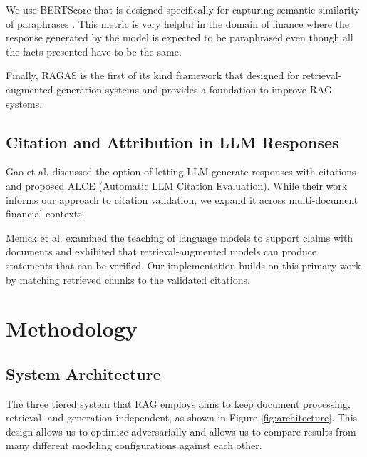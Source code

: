 \documentclass[runningheads]{llncs}
\begin{document}
We use BERTScore that is designed specifically for capturing semantic similarity of paraphrases \cite{zhang2019bertscore}. This metric is very helpful in the domain of finance where the response generated by the model is expected to be paraphrased even though all the facts presented have to be the same.

Finally, RAGAS \cite{es2023ragas} is the first of its kind framework that designed for retrieval-augmented generation systems and provides a foundation to improve RAG systems.


\subsection{Citation and Attribution in LLM Responses}  



Gao et al.\cite{gao2023enabling} discussed the option of letting LLM generate responses with citations and proposed ALCE (Automatic LLM Citation Evaluation). While their work informs our approach to citation validation, we expand it across multi-document financial contexts.  



Menick et al.\cite{menick2022teaching} examined the teaching of language models to support claims with documents and exhibited that retrieval-augmented models can produce statements that can be verified. Our implementation builds on this primary work by matching retrieved chunks to the validated citations.


\section{Methodology}

\subsection{System Architecture}

The three tiered system that RAG employs aims to keep document processing, retrieval, and generation independent, as shown in Figure \ref{fig:architecture}. This design allows us to optimize adversarially and allows us to compare results from many different modeling configurations against each other.
\end{document}

